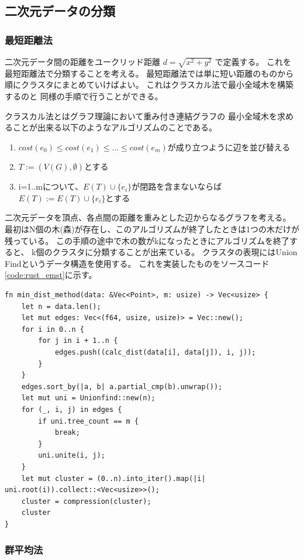 \documentclass[dvipdfmx]{jsarticle}
\begin{document}
\subsection{二次元データの分類}

\subsubsection{最短距離法}
二次元データ間の距離をユークリッド距離
$d = \sqrt{x^2 + y^2}$
で定義する。
これを最短距離法で分類することを考える。
最短距離法では単に短い距離のものから順にクラスタにまとめていけばよい。
これはクラスカル法で最小全域木を構築するのと
同様の手順で行うことができる。

クラスカル法とはグラフ理論において重み付き連結グラフの
最小全域木を求めることが出来る以下のようなアルゴリズムのことである。
\begin{enumerate}
  \item $cost(e_0) \leq cost(e_1) \leq \dots \leq cost(e_m)$が成り立つように辺を並び替える
  \item $T:=(V(G),\emptyset)$とする
  \item i=1..mについて、$E(T) \cup \{e_i\}$が閉路を含まないならば$E(T) := E(T) \cup \{e_i\}$とする
\end{enumerate}
二次元データを頂点、各点間の距離を重みとした辺からなるグラフを考える。
最初はN個の木(森)が存在し、このアルゴリズムが終了したときは1つの木だけが残っている。
この手順の途中で木の数がkになったときにアルゴリズムを終了すると、
k個のクラスタに分類することが出来ている。
クラスタの表現にはUnion Findというデータ構造を使用する。
これを実装したものをソースコード\ref{code:rust_emst}に示す。

\begin{lstlisting}[caption=Rustによる最短距離法の実装,label=code:rust_emst]
fn min_dist_method(data: &Vec<Point>, m: usize) -> Vec<usize> {
    let n = data.len();
    let mut edges: Vec<(f64, usize, usize)> = Vec::new();
    for i in 0..n {
        for j in i + 1..n {
            edges.push((calc_dist(data[i], data[j]), i, j));
        }
    }
    edges.sort_by(|a, b| a.partial_cmp(b).unwrap());
    let mut uni = Unionfind::new(n);
    for (_, i, j) in edges {
        if uni.tree_count == m {
            break;
        }
        uni.unite(i, j);
    }
    let mut cluster = (0..n).into_iter().map(|i| uni.root(i)).collect::<Vec<usize>>();
    cluster = compression(cluster);
    cluster
}
\end{lstlisting}

\subsubsection{群平均法}
\end{document}
